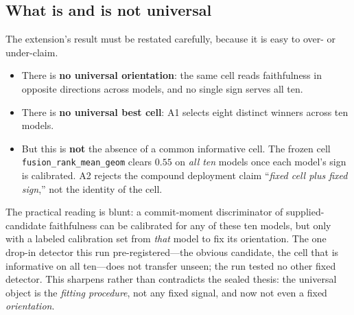 \documentclass[11pt]{article}
\begin{document}
\subsection{What is and is not universal}

The extension's result must be restated carefully, because it is easy to over- or under-claim.

\begin{itemize}
\item There is \textbf{no universal orientation}: the same cell reads faithfulness in opposite
directions across models, and no single sign serves all ten.
\item There is \textbf{no universal best cell}: A1 selects eight distinct winners across ten models.
\item But this is \textbf{not} the absence of a common informative cell. The frozen cell
\texttt{fusion\_rank\_mean\_geom} clears $0.55$ on \emph{all ten} models once each model's sign is
calibrated. A2 rejects the compound deployment claim ``\emph{fixed cell plus fixed sign},'' not the
identity of the cell.
\end{itemize}

The practical reading is blunt: a commit-moment discriminator of supplied-candidate faithfulness
can be calibrated for any of these ten models, but only with a labeled calibration set from
\emph{that} model to fix its orientation.
The one drop-in detector this run pre-registered---the obvious candidate, the cell that is
informative on all ten---does not transfer unseen; the run tested no other fixed detector. This
sharpens rather than contradicts the sealed thesis: the universal object is the \emph{fitting
procedure}, not any fixed signal, and now not even a fixed \emph{orientation}.
\end{document}
